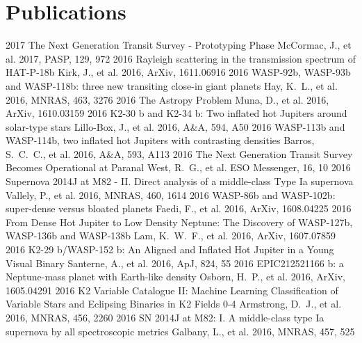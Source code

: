 \documentclass[print]{friggeri-cv} %
\begin{document}
\section{Publications}
\begin{entrylist}
\entry
{\small 2017}
{\small The Next Generation Transit Survey - Prototyping Phase}
{}
{\small McCormac, J., et al. 2017, PASP, 129, 972}
\entry
{\small 2016}
{\normalfont \small Rayleigh scattering in the transmission spectrum of HAT-P-18b}
{}
{\small Kirk, J., et al. 2016, ArXiv, 1611.06916}
\entry
{\small 2016}
{\normalfont \small WASP-92b, WASP-93b and WASP-118b: three new transiting close-in giant planets}
{}
{\small Hay, K.~L., et al. 2016,  MNRAS, 463, 3276}
\entry
{\small 2016}
{\normalfont \small The Astropy Problem}
{}
{\small Muna, D., et al. 2016, ArXiv, 1610.03159}
\entry
{\small 2016}
{\normalfont \small K2-30 b and K2-34 b: Two inflated hot Jupiters around solar-type stars}
{}
{\small Lillo-Box, J., et al. 2016, A\&A, 594, A50}
\entry
{\small 2016}
{\normalfont \small WASP-113b and WASP-114b, two inflated hot Jupiters with contrasting densities}
{}
{\small Barros, S.~C.~C., et al. 2016, A\&A, 593, A113}
\entry
{\small 2016}
{\normalfont \small The Next Generation Transit Survey Becomes Operational at Paranal}
{}
{\small West, R.~G., et al. ESO Messenger, 16, 10}
\entry
{\small 2016}
{\normalfont \small Supernova 2014J at M82 - II. Direct analysis of a middle-class Type Ia supernova}
{}
{\small Vallely, P., et al. 2016, MNRAS, 460, 1614}
\entry
{\small 2016}
{\normalfont \small WASP-86b and WASP-102b: super-dense versus bloated planets}
{}
{\small Faedi, F., et al. 2016, ArXiv, 1608.04225}
\entry
{\small 2016}
{\normalfont \small From Dense Hot Jupiter to Low Density Neptune: The Discovery of WASP-127b, WASP-136b and WASP-138b}
{}
{\small Lam, K.~W.~F., et al. 2016, ArXiv, 1607.07859}
\entry
{\small 2016}
{\normalfont \small K2-29 b/WASP-152 b: An Aligned and Inflated Hot Jupiter in a Young Visual Binary}
{}
{\small Santerne, A., et al. 2016,  ApJ, 824, 55}
\entry
{\small 2016}
{\normalfont \small EPIC212521166 b: a Neptune-mass planet with Earth-like density}
{}
{\small Osborn, H.~P., et al. 2016, ArXiv, 1605.04291}
\entry
{\small 2016}
{\normalfont \small K2 Variable Catalogue II: Machine Learning Classification of Variable Stars and Eclipsing Binaries in K2 Fields 0-4}
{}
{\small Armstrong, D.~J., et al. 2016, MNRAS, 456, 2260}
\entry
{\small 2016}
{\normalfont \small SN 2014J at M82: I. A middle-class type Ia supernova by all spectroscopic metrics}
{}
{\small Galbany, L., et al. 2016, MNRAS, 457, 525}
\end{entrylist}
\end{document}
